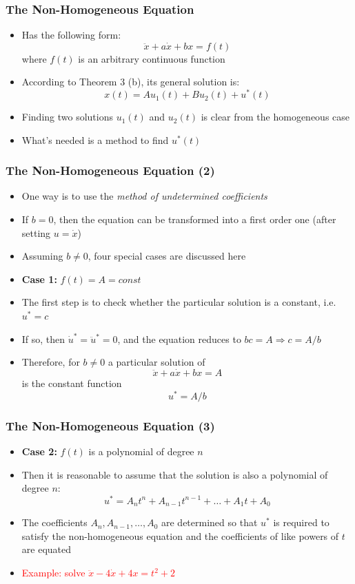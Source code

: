 \documentclass[10pt,usenames,dvipsnames]{beamer}
\theoremstyle{definition}
\begin{document}
\begin{frame}[fragile]
\frametitle{The Non-Homogeneous Equation}
\begin{itemize}
	\item Has the following form:
	\[
		\ddot{x} + a\dot{x} + bx = f(t)
	\]
	where $f(t)$ is an arbitrary continuous function 
	\item According to Theorem 3 (b), its general solution is:
	\[
		x(t) = Au_{1}(t) + Bu_{2}(t) + u^{*}(t)
	\]
	\item Finding two solutions $u_{1}(t)$ and $u_{2}(t)$ is clear from the homogeneous case
	\item What's needed is a method to find $u^{*}(t)$
\end{itemize}
\end{frame}

\begin{frame}[fragile]
\frametitle{The Non-Homogeneous Equation (2)}
\begin{itemize}
	\item One way is to use the \textit{method of undetermined coefficients}
	\item If $b = 0$, then the equation can be transformed into a first order one (after setting $u = \dot{x}$)
	\item Assuming $b \neq 0$, four special cases are discussed here
	\item \textbf{Case 1:} $f(t) = A = const$
	\item The first step is to check whether the particular solution is a constant, i.e. $u^{*} = c$
	\item If so, then $\dot{u}^{*} = \ddot{u}^{*} = 0$, and the equation reduces to $bc = A \Rightarrow c = A/b$
	\item Therefore, for $b \neq 0$ a particular solution of 
	\[
		\ddot{x} + a\dot{x} + bx = A
	\]
	is the constant function
	\[
		u^{*} = A/b
	\]
\end{itemize}
\end{frame}

\begin{frame}[fragile]
\frametitle{The Non-Homogeneous Equation (3)}
\begin{itemize}
	\item \textbf{Case 2:} $f(t)$ is a polynomial of degree $n$
	\item Then it is reasonable to assume that the solution is also a polynomial of degree $n$:
	\[
		u^{*} = A_{n}t^{n} + A_{n-1}t^{n-1} + \ldots + A_{1}t + A_{0}
	\]
	\item The coefficients $A_{n}, A_{n-1},\ldots,A_{0}$ are determined so that $u^{*}$ is required to satisfy the non-homogeneous equation and the coefficients of like powers of $t$ are equated
	\item \textcolor{red}{Example: solve $\ddot{x} - 4\dot{x} + 4x = t^{2} + 2$}
\end{itemize}
\end{frame}
\end{document}
